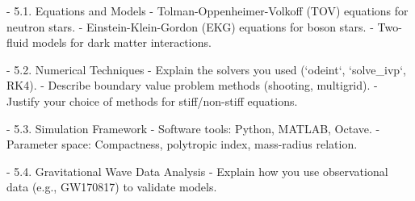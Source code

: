 - 5.1. Equations and Models  
     - Tolman-Oppenheimer-Volkoff (TOV) equations for neutron stars.  
     - Einstein-Klein-Gordon (EKG) equations for boson stars.  
     - Two-fluid models for dark matter interactions.  

- 5.2. Numerical Techniques  
     - Explain the solvers you used (`odeint`, `solve\_ivp`, RK4).  
     - Describe boundary value problem methods (shooting, multigrid).  
     - Justify your choice of methods for stiff/non-stiff equations.  

- 5.3. Simulation Framework  
     - Software tools: Python, MATLAB, Octave.  
     - Parameter space: Compactness, polytropic index, mass-radius relation.  

- 5.4. Gravitational Wave Data Analysis  
     - Explain how you use observational data (e.g., GW170817) to validate models.  
